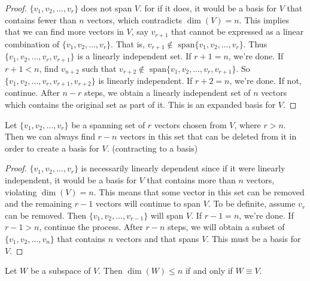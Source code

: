 \documentclass[12pt]{article}
\begin{document}
\begin{proof} $\{v_1, v_2, \dots, v_r\}$ does not span $V$. for if it does, it would be a basis for $V$ that contains fewer than $n$ vectors, which contradicts $\dim(V) = n$. This implies that we can find more vectors in $V$, say $v_{r + 1}$ that cannot be expressed as a linear combination of $\{v_1, v_2, \dots, v_r\}$. That is, $v_{r + 1} \notin \text{ span}\{v_1, v_2, \dots, v_r\}$. Thus $\{v_1, v_2, \dots, v_r, v_{r + 1}\}$ is a linearly independent set. If $r + 1 = n$, we're done. If $r + 1 < n$, find $v_{n + 2}$ such that $v_{r + 2} \notin \text{ span}\{v_1, v_2, \dots, v_r, v_{r + 1}\}$. So $\{v_1, v_2, \dots, v_r, v_{r + 1}, v_{r + 2}\}$ is linearly independent. If $r + 2 = n$, we're done. If not, continue. After $n - r$ steps, we obtain a linearly independent set of $n$ vectors which contains the original set as part of it. This is an expanded basis for $V$. \end{proof}
\begin{theorem} Let $\{v_1, v_2, \dots, v_r\}$ be a spanning set of $r$ vectors chosen from $V$, where $r > n$. Then we can always find $r - n$ vectors in this set that can be deleted from it in order to create a basis for $V$. (contracting to a basis) \end{theorem} 
\begin{proof} $\{v_1, v_2, \dots, v_r\}$ is necessarily linearly dependent since if it were linearly independent, it would be a basis for $V$ that contains more than $n$ vectors, violating $\dim(V) = n$. This means that some vector in this set can be removed and the remaining $r - 1$ vectors will continue to span $V$. To be definite, assume $v_r$ can be removed. Then $\{v_1, v_2, \dots, v_{r - 1}\}$ will span $V$. If $r - 1 = n$, we're done. If $r - 1 > n$, continue the process. After $r - n$ steps, we will obtain a subset of $\{v_1, v_2, \dots, v_n\}$ that contains $n$ vectors and that spans $V$. This must be a basis for $V$. \end{proof} 
\begin{theorem} Let $W$ be a subspace of $V$. Then $\dim(W) \leq n$ if and only if $W \equiv V$. \end{theorem} 
\end{document}
